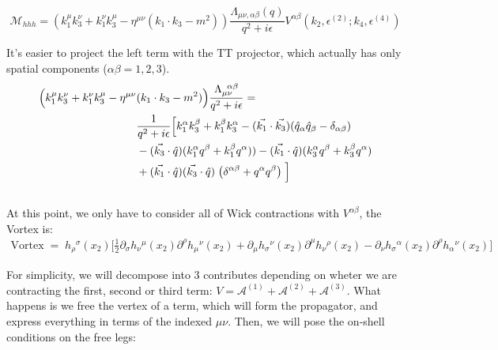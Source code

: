 \documentclass[12pt,a4paper,oneside]{article}
\numberwithin{equation}{section}   %
\begin{document}
\[ 
\mathcal M_{hhh}=\left(k_1^\mu k_3^\nu+k_1^\nu k_3^\mu-\eta^{\mu\nu}(k_1 \cdot k_3-m^2)\right)\frac{\Lambda_{\mu\nu,\alpha\beta}(q)}{q^2+i\epsilon}V^{\alpha\beta}(k_2,\epsilon^{(2)};k_4,\epsilon^{(4)})
\]

It's easier to project the left term with the TT projector, which actually has only spatial components ($\alpha\beta=1,2,3$).
\begin{align}
    \Bigl(k_1^\mu k_3^\nu + k_1^\nu  k_3^\mu-\eta^{\mu\nu}&(k_1 \cdot k_3-m^2)\Bigr)\frac{\Lambda_{\mu\nu}^{\;\;\alpha\beta}}{q^2+i\epsilon} = \\&
    \frac{1}{q^2+i\epsilon}\Bigl[
        k_1^\alpha k_3^\beta +k_1^\beta k_3^\alpha - (\vec{k_1}\cdot \vec{k_3})(\hat{q}_\alpha\hat{q}_\beta-\delta_{\alpha\beta})\\& -(\vec{k_3}\cdot \hat{q})(k_1^\alpha q^\beta+k_1^\beta q^\alpha)) - (\vec{k_1}\cdot \hat{q})(k_3^\alpha q^\beta+k_3^\beta q^\alpha)\\&
        +(\vec{k_1}\cdot\hat{q})(\vec{k_3}\cdot\hat{q})\;\bigl(\delta^{\alpha\beta}+q^\alpha q^\beta\bigr) \;
    \Bigr]
\end{align}\\
At this point, we only have to consider all of Wick contractions with $V^{\alpha\beta}$, the Vortex is:
\begin{align}
\text{Vortex} \; = \;h_{\rho}{}^{\sigma}(x_2)
\Bigg[
\frac12
\partial_{\sigma}h_{\nu}{}^{\mu}(x_2)
\partial^{\rho}h_{\mu}{}^{\nu}(x_2)
+
\partial_{\mu}h_{\sigma}{}^{\nu}(x_2)
\partial^{\mu}h_{\nu}{}^{\rho}(x_2)
-
\partial_{\nu}h_{\sigma}{}^{\alpha}(x_2)
\partial^{\rho}h_{\alpha}{}^{\nu}(x_2)
\Bigg]
\end{align}

For simplicity, we will decompose into 3 contributes depending on wheter we are contracting the first, second or third term:
$V= \mathcal{A}^{(1)}+\mathcal{A}^{(2)}+\mathcal{A}^{(3)}$. What happens is we free the vertex of a term, which will form the propagator, and express everything in terms of the indexed $\mu\nu$. Then, we will pose the on-shell conditions on the free legs:
\end{document}
